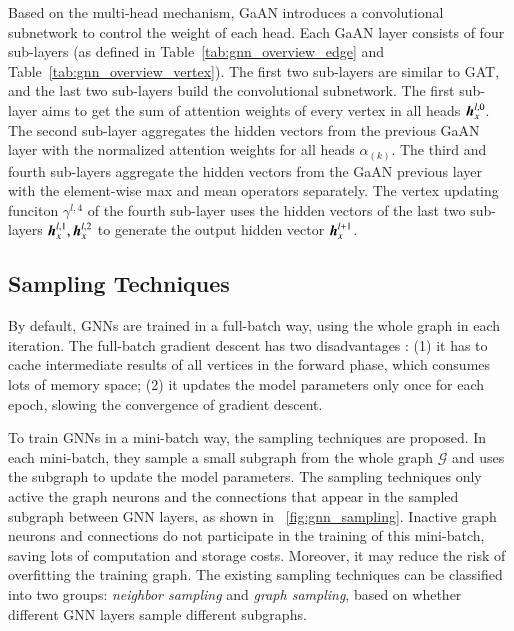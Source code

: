 Based on the multi-head mechanism, GaAN \cite{zhang2018_gaan} introduces a convolutional subnetwork to control the weight of each head.
%
Each GaAN layer consists of four sub-layers (as defined in Table~\ref{tab:gnn_overview_edge} and Table~\ref{tab:gnn_overview_vertex}).
%
The first two sub-layers are similar to GAT, and the last two sub-layers build the convolutional subnetwork.
%
The first sub-layer aims to get the sum of attention weights of every vertex in all heads $\boldsymbol{h}^{l,0}_x$.
The second sub-layer aggregates the hidden vectors from the previous GaAN layer with the normalized attention weights for all heads $\alpha_{(k)}$.
The third and fourth sub-layers aggregate the hidden vectors from the GaAN previous layer with the element-wise max and mean operators separately.
The vertex updating funciton $\gamma^{l,4}$ of the fourth sub-layer uses the hidden vectors of the last two sub-layers $\boldsymbol{h}^{l, 1}_x, \boldsymbol{h}^{l, 2}_x$ to generate the output hidden vector $\boldsymbol{h}^{l+1}_x$.

\subsection{Sampling Techniques}

By default, GNNs are trained in a full-batch way, using the whole graph in each iteration.
%
The full-batch gradient descent has two disadvantages \cite{chiang2019_cluster_gcn}:
%
(1) it has to cache intermediate results of all vertices in the forward phase, which consumes lots of memory space;
%
(2) it updates the model parameters only once for each epoch, slowing the convergence of gradient descent.

To train GNNs in a mini-batch way, the sampling techniques \cite{hamilton2017_graphsage, ying2018_pinsage, chen2018_fastgcn, chen2018_sgcn, zeng2018_aesg, chiang2019_cluster_gcn, zeng2020_graphsaint} are proposed.
%
In each mini-batch, they sample a small subgraph from the whole graph $\mathcal{G}$ and uses the subgraph to update the model parameters.
%
The sampling techniques only active the graph neurons and the connections that appear in the sampled subgraph between GNN layers, as shown in \figurename~\ref{fig:gnn_sampling}.
%
Inactive graph neurons and connections do not participate in the training of this mini-batch, saving lots of computation and storage costs.
%
Moreover, it may reduce the risk of overfitting the training graph.
%
The existing sampling techniques can be classified into two groups: \emph{neighbor sampling} and \emph{graph sampling}, based on whether different GNN layers sample different subgraphs.

